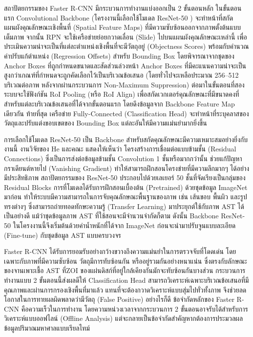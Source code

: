 สถาปัตยกรรมของ Faster R-CNN มีกระบวนการทำงานแบ่งออกเป็น 2 ขั้นตอนหลัก ในขั้นตอนแรก Convolutional Backbone (โครงงานนี้เลือกใช้โมเดล ResNet-50 \cite{he2016deep}) จะทำหน้าที่สกัดแผนผังคุณลักษณะเชิงพื้นที่ (Spatial Feature Maps) ที่มีความซับซ้อนออกจากภาพตั้งต้นแบบเต็มภาพ จากนั้น RPN จะใช้เครือข่ายย่อยกวาดเลื่อน (Slide) ไปบนแผนผังคุณลักษณะเหล่านี้ เพื่อประเมินความน่าจะเป็นที่แต่ละตำแหน่งเชิงพื้นที่จะมีวัตถุอยู่ (Objectness Scores) พร้อมกับคำนวณค่าปรับแก้ตำแหน่ง (Regression Offsets) สำหรับ Bounding Box โดยพิจารณาจากชุดของ Anchor Boxes ที่ถูกกำหนดขนาดและสัดส่วนล่วงหน้า Anchor Boxes ที่มีคะแนนความน่าจะเป็นสูงกว่าเกณฑ์ที่กำหนดจะถูกคัดเลือกไว้เป็นบริเวณข้อเสนอ (โดยทั่วไปจะเหลือประมาณ 256--512 บริเวณต่อภาพ หลังจากผ่านกระบวนการ Non-Maximum Suppression) ต่อมาในขั้นตอนที่สอง ระบบจะใช้ฟังก์ชัน RoI Pooling (หรือ RoI Align) เพื่อสกัดเวกเตอร์คุณลักษณะที่มีขนาดคงที่สำหรับแต่ละบริเวณข้อเสนอที่ได้จากขั้นตอนแรก โดยดึงข้อมูลจาก Backbone Feature Map เดียวกัน ท้ายที่สุด เครือข่าย Fully-Connected (Classification Head) จะทำหน้าที่ระบุคลาสของวัตถุและปรับแต่งขอบเขตของ Bounding Box แต่ละอันให้มีความแม่นยำมากยิ่งขึ้น

การเลือกใช้โมเดล ResNet-50 เป็น Backbone สำหรับสกัดคุณลักษณะมีความเหมาะสมอย่างยิ่งกับงานนี้ งานวิจัยของ He และคณะ แสดงให้เห็นว่า โครงสร้างการเชื่อมต่อแบบข้ามชั้น (Residual Connections) ซึ่งเป็นการส่งต่อข้อมูลข้ามชั้น Convolution 1 ชั้นหรือมากกว่านั้น ช่วยแก้ปัญหากราเดียนต์หายไป (Vanishing Gradient) ทำให้สามารถฝึกสอนโครงข่ายที่มีความลึกมากๆ ได้อย่างมีประสิทธิภาพ \cite{he2016deep} สถาปัตยกรรมของ ResNet-50 ประกอบไปด้วยเลเยอร์ 50 ชั้นที่จัดเรียงเป็นกลุ่มของ Residual Blocks การที่โมเดลได้รับการฝึกสอนเบื้องต้น (Pretrained) ด้วยชุดข้อมูล ImageNet มาก่อน ทำให้ระบบมีความสามารถในการจับคุณลักษณะพื้นฐานของภาพ เช่น เส้นขอบ พื้นผิว และรูปทรงต่างๆ ซึ่งสามารถถ่ายทอดทักษะความรู้ (Transfer Learning) มาประยุกต์ใช้กับภาพ AST ได้เป็นอย่างดี แม้ว่าชุดข้อมูลภาพ AST ที่ใช้สอนจะมีจำนวนจำกัดก็ตาม ดังนั้น Backbone ResNet-50 ในโครงงานนี้จึงเริ่มต้นด้วยค่าน้ำหนักที่ได้จาก ImageNet ก่อนจะนำมาปรับจูนแบบละเอียด (Fine-tune) กับชุดข้อมูล AST แบบครบวงจร

Faster R-CNN ได้รับการยอมรับอย่างกว้างขวางถึงความแม่นยำในการตรวจจับที่โดดเด่น โดยเฉพาะกับภาพที่มีความซับซ้อน วัตถุมีการทับซ้อนกัน หรืออยู่รวมกันอย่างหนาแน่น ซึ่งตรงกับลักษณะของจานเพาะเชื้อ AST ที่ZOI ของแผ่นดิสก์ที่อยู่ใกล้เคียงกันมักจะทับซ้อนกันบางส่วน กระบวนการทำงานแบบ 2 ขั้นตอนนี้ส่งผลดีให้ Classification Head สามารถวิเคราะห์เฉพาะบริเวณข้อเสนอที่มีคุณภาพและผ่านการกรองเชิงพื้นที่มาแล้ว แทนที่จะต้องกวาดวิเคราะห์แบบสุ่มไปทั่วทั้งภาพ จึงช่วยลดโอกาสในการทายผลผิดพลาดว่ามีวัตถุ (False Positive) อย่างไรก็ดี ข้อจำกัดหลักของ Faster R-CNN คือความเร็วในการทำงาน โดยความหน่วงเวลาจากกระบวนการ 2 ขั้นตอนอาจรับได้สำหรับการวิเคราะห์แบบออฟไลน์ (Offline Analysis) แต่จะกลายเป็นข้อจำกัดสำคัญหากต้องการประมวลผลข้อมูลปริมาณมหาศาลแบบเรียลไทม์


